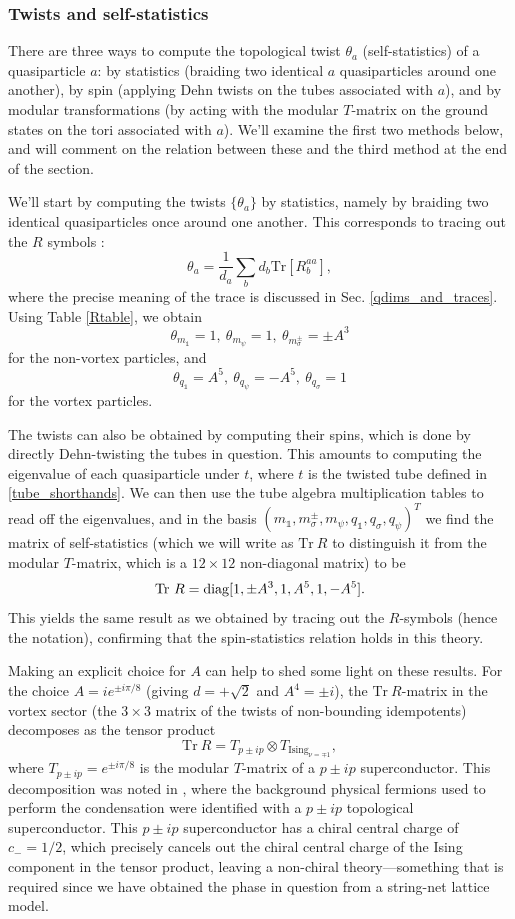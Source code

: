 \documentclass[12pt,a4paper]{article}
\newcommand{\tp}{\otimes}
\newcommand{\unit}{\mathds{1}}
\newcommand\be            {\begin{equation}}
\newcommand\ee            {\end{equation}}
\newcommand{\Tr}{\text{Tr}}
\begin{document}
\subsubsection{Twists and self-statistics}

There are three ways to compute the topological twist $\theta_a$ (self-statistics) of a quasiparticle $a$: by statistics (braiding two identical $a$ quasiparticles around one another), by spin (applying Dehn twists on the tubes associated with $a$), and by modular transformations (by acting with the modular $T$-matrix on the ground states on the tori associated with $a$). 
We'll examine the first two methods below, and will comment on the relation between these and the third method at the end of the section. 

We'll start by computing the twists $\{\theta_a\}$ by statistics, namely by braiding two identical quasiparticles once around one another. 
This corresponds to tracing out the $R$ symbols \cite{barkeshli2014}:
\be \label{Tmattr} \theta_a = \frac{1}{d_a}\sum_b d_b \text{Tr}[R^{aa}_b],\ee
where the precise meaning of the trace is discussed in Sec. \ref{qdims_and_traces}.
Using Table \ref{Rtable}, we obtain
\be \theta_{m_\unit} = 1,\ \theta_{m_\psi} = 1,\ \theta_{m^\pm_\sigma} = \pm A^3\ee
for the non-vortex particles, and 
\be \theta_{q_\unit} = A^5,\ \theta_{q_\psi} = -A^5,\ \theta_{q_\sigma} = 1\ee
for the vortex particles. 

The twists can also be obtained by computing their spins, which is done by directly Dehn-twisting the tubes in question. 
This amounts to computing the eigenvalue of each quasiparticle under $t$, where $t$ is the twisted tube defined in \eqref{tube_shorthands}.
We can then use the tube algebra multiplication tables to read off the eigenvalues, and in the basis $(m_\unit,m^\pm_\sigma,m_\psi,q_\unit,q_\sigma,q_\psi)^T$ we find the matrix of self-statistics (which we will write as $\Tr\ R$ to distinguish it from the modular $T$-matrix, which is a $12\times 12$ non-diagonal matrix) to be
\be \Tr\ R = {\rm diag}[1,\pm A^3,1,A^{5},1,-A^{5}].\ee
This yields the same result as we obtained by tracing out the $R$-symbols (hence the notation), confirming that the spin-statistics relation holds in this theory.

Making an explicit choice for $A$ can help to shed some light on these results. For the choice $A = ie^{\pm i \pi/8}$ (giving $d=+\sqrt{2}$ and $A^4 = \pm i$), the $\Tr\ R$-matrix in the vortex sector (the $3\times3$ matrix of the twists of non-bounding idempotents) decomposes as the tensor product
\be \Tr\ R = T_{p\pm ip} \tp T_{\text{Ising}_{\nu =\mp1}},\ee
where $T_{p\pm ip} = e^{\pm i\pi/8}$ is the modular $T$-matrix of a $p\pm ip$ superconductor. 
This decomposition was noted in \cite{ware2016}, where the background physical fermions used to perform the condensation 
were identified with a $p\pm ip$ topological superconductor. 
This $p\pm ip$ superconductor has a chiral central charge of $c_-=1/2$, which precisely cancels 
out the chiral central charge of the Ising component in the tensor product, leaving a non-chiral theory---something
that is required since we have obtained the phase in question from a string-net lattice model. 
\end{document}
